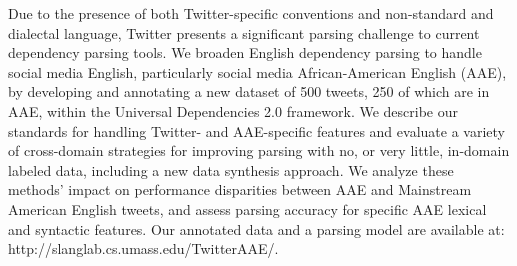 Due to the presence of both Twitter-specific conventions and non-standard and dialectal language, Twitter presents a significant parsing challenge to current dependency parsing tools. We broaden English dependency parsing to handle social media English, particularly social media African-American English (AAE), by developing and annotating a new dataset of 500 tweets, 250 of which are in AAE, within the Universal Dependencies 2.0 framework. We describe our standards for handling Twitter- and AAE-specific features and evaluate a variety of cross-domain strategies for improving parsing with no, or very little, in-domain labeled data, including a new data synthesis approach. We analyze these methods' impact on performance disparities between AAE and Mainstream American English tweets, and assess parsing accuracy for specific AAE lexical and syntactic features. Our annotated data and a parsing model are available at: http://slanglab.cs.umass.edu/TwitterAAE/.
